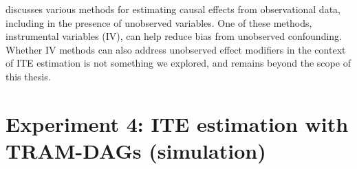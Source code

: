 \citet{nichols2007} discusses various methods for estimating causal effects from observational data, including in the presence of unobserved variables. One of these methods, instrumental variables (IV), can help reduce bias from unobserved confounding. Whether IV methods can also address unobserved effect modifiers in the context of ITE estimation is not something we explored, and remains beyond the scope of this thesis.






























\section{Experiment 4: ITE estimation with TRAM-DAGs (simulation)} \label{ch:exp4}








% 


